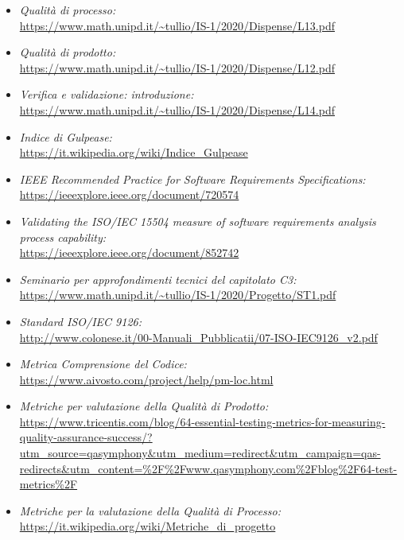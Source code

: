 \begin{itemize}
	\item \textit{Qualità di processo:}\\
		\url{https://www.math.unipd.it/~tullio/IS-1/2020/Dispense/L13.pdf}
	\item \textit{Qualità di prodotto:}\\
		\url{https://www.math.unipd.it/~tullio/IS-1/2020/Dispense/L12.pdf}
	\item \textit{Verifica e validazione: introduzione:}\\
		\url{https://www.math.unipd.it/~tullio/IS-1/2020/Dispense/L14.pdf}
	\item \textit{Indice di Gulpease:}\\
		\url{https://it.wikipedia.org/wiki/Indice_Gulpease}
	\item \textit{IEEE Recommended Practice for Software Requirements Specifications:}\\
		\url{https://ieeexplore.ieee.org/document/720574}
	\item \textit{Validating the ISO/IEC 15504 measure of software requirements analysis process capability:}\\
		\url{https://ieeexplore.ieee.org/document/852742}
	\item \textit{Seminario per approfondimenti tecnici del capitolato C3:}\\
		\url{https://www.math.unipd.it/~tullio/IS-1/2020/Progetto/ST1.pdf}	
	\item \textit{Standard ISO/IEC 9126:} \\
		\url{http://www.colonese.it/00-Manuali_Pubblicatii/07-ISO-IEC9126_v2.pdf}
	\item \textit{Metrica Comprensione del Codice:} \\
		\url{https://www.aivosto.com/project/help/pm-loc.html}
	\item \textit{Metriche per valutazione della Qualità di Prodotto:} \\
		\url{https://www.tricentis.com/blog/64-essential-testing-metrics-for-measuring-quality-assurance-success/?utm_source=qasymphony&utm_medium=redirect&utm_campaign=qas-redirects&utm_content=%2F%2Fwww.qasymphony.com%2Fblog%2F64-test-metrics%2F}
	\item \textit{Metriche per la valutazione della Qualità di Processo:} \\
		\url{https://it.wikipedia.org/wiki/Metriche_di_progetto}
\end{itemize}